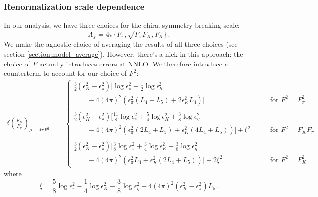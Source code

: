 \documentclass[prd,tightenlines,preprintnumbers,showpacs,superscriptaddress,notitlepage,eqsecnum,floatfix,notitlepage]{revtex4-1}
\begin{document}
\subsubsection{Renormalization scale dependence}
In our analysis, we have three choices for the chiral symmetry breaking scale:
\begin{equation}
\Lambda_\chi  = 4 \pi \{ F_\pi, \sqrt{F_\pi F_K}, F_K\} \, .
\end{equation}
We make the agnostic choice of averaging the results of all three choices (see section \ref{section:model_average}). However, there's a nick in this approach: the choice of $F$ actually introduces errors at NNLO. We therefore introduce a counterterm to account for our choice of $F^2$:
\begin{align}
\delta\left(\frac{F_K}{F_\pi}\right)_{\mu = 4\pi F^2} &=
\begin{cases}
\frac 32 \left( \epsilon^2_K - \epsilon_\pi^2 \right) \big[
\log \epsilon_\pi^2 + \frac 12 \log \epsilon^2_K \\
\qquad - 4 (4\pi)^2 \left( \epsilon_\pi^2 (L_4 + L_5 ) + 2\epsilon_K^2 L_4 \right)
\big] 
&\qquad \text{for $F^2= F_\pi^2$} \\ \\
\frac 32 \left( \epsilon^2_K - \epsilon_\pi^2 \right) \big[
\frac{11}{8} \log \epsilon_\pi^2 + \frac 54 \log \epsilon^2_K + \frac 38 \log \epsilon_\eta^2 \\
\qquad - 4 (4\pi)^2 \left( \epsilon_\pi^2 (2 L_4 + L_5) + \epsilon_K^2 (4 L_4 + L_5) \right)
\big] + \xi^2
&\qquad \text{for $F^2= F_K F_\pi $} \\ \\
\frac 32 \left( \epsilon^2_K - \epsilon_\pi^2 \right) \big[
\frac{3}{8} \log \epsilon_\pi^2 + \frac 34 \log \epsilon^2_K + \frac 38 \log \epsilon_\eta^2 \\
\qquad - 4 (4\pi)^2 \left( \epsilon_\pi^2 L_4 + \epsilon_K^2  (2 L_4 + L_5) \right)
\big] + 2 \xi^2
&\qquad \text{for $F^2= F_K^2$}
\end{cases}
\end{align}
where
\begin{equation}
\xi = \frac 58 \log \epsilon_\pi^2 - \frac 14 \log \epsilon_K^2 - \frac 38 \log \epsilon_\eta^2 
+ 4 (4 \pi)^2 \left(\epsilon_K^2 - \epsilon_\pi^2\right) L_5 \, .
\end{equation}
\end{document}
